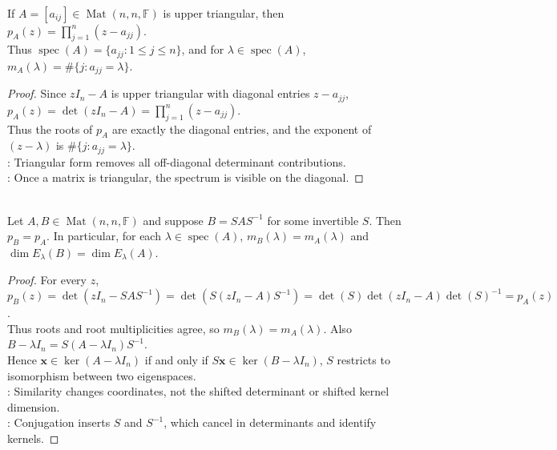 \begin{proposition} \label{prop:upper-triangular-characteristic-polynomial} \\
If $A=[a_{ij}]\in\operatorname{Mat}(n,n,\mathbb{F})$ is upper triangular, then $p_A(z)=\prod\limits_{j=1}^{n}(z-a_{jj})$.\\
Thus $\operatorname{spec}(A)=\{a_{jj}:1\leq j\leq n\}$, and for $\lambda\in\operatorname{spec}(A)$, $m_A(\lambda)=\#\{j:a_{jj}=\lambda\}$.
\begin{proof}
Since $zI_n-A$ is upper triangular with diagonal entries $z-a_{jj}$, $p_A(z)=\det(zI_n-A)=\prod\limits_{j=1}^{n}(z-a_{jj})$.\\
Thus the roots of $p_A$ are exactly the diagonal entries, and the exponent of $(z-\lambda)$ is $\#\{j:a_{jj}=\lambda\}$.\\
: Triangular form removes all off-diagonal determinant contributions.\\
: Once a matrix is triangular, the spectrum is visible on the diagonal.
\end{proof}
\end{proposition}

\begin{theorem} \label{thm:similarity-preserves-characteristic-polynomial} \\
Let $A,B\in\operatorname{Mat}(n,n,\mathbb{F})$ and suppose $B=SAS^{-1}$ for some invertible $S$. Then $p_B=p_A$. In particular, for each $\lambda\in\operatorname{spec}(A)$, $m_B(\lambda)=m_A(\lambda)$ and $\dim E_{\lambda}(B)=\dim E_{\lambda}(A)$.
\begin{proof}
For every $z$, $p_B(z) =\det(zI_n-SAS^{-1}) =\det(S(zI_n-A)S^{-1}) =\det(S)\det(zI_n-A)\det(S)^{-1} =p_A(z)$.\\
Thus roots and root multiplicities agree, so $m_B(\lambda)=m_A(\lambda)$. Also $B-\lambda I_n=S(A-\lambda I_n)S^{-1}$.\\
Hence $\mathbf{x}\in\ker(A-\lambda I_n)$ if and only if $S\mathbf{x}\in\ker(B-\lambda I_n)$, $S$ restricts to isomorphism between two eigenspaces.\\
: Similarity changes coordinates, not the shifted determinant or shifted kernel dimension.\\
: Conjugation inserts $S$ and $S^{-1}$, which cancel in determinants and identify kernels.
\end{proof}
\end{theorem}

